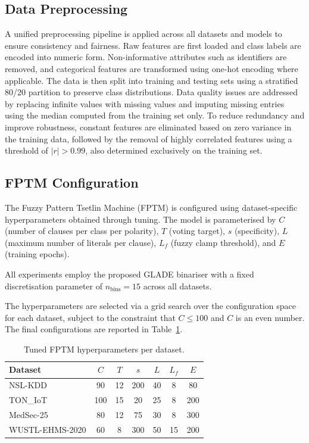 \documentclass[journal,twoside,web]{ieeecolor}
\begin{document}
\subsection{Data Preprocessing}
\label{sec:preprocessing}

A unified preprocessing pipeline is applied across all datasets and models to ensure consistency and fairness. Raw features are first loaded and class labels are encoded into numeric form. Non-informative attributes such as identifiers are removed, and categorical features are transformed using one-hot encoding where applicable. The data is then split into training and testing sets using a stratified 80/20 partition to preserve class distributions. Data quality issues are addressed by replacing infinite values with missing values and imputing missing entries using the median computed from the training set only. To reduce redundancy and improve robustness, constant features are eliminated based on zero variance in the training data, followed by the removal of highly correlated features using a threshold of $|r| > 0.99$, also determined exclusively on the training set.

\subsection{FPTM Configuration}
\label{sec:fptm-config}

The Fuzzy Pattern Tsetlin Machine (FPTM) is configured using
dataset-specific hyperparameters obtained through tuning.
The model is parameterised by $C$ (number of clauses per class per
polarity), $T$ (voting target), $s$ (specificity), $L$ (maximum number
of literals per clause), $L_f$ (fuzzy clamp threshold), and $E$
(training epochs).

All experiments employ the proposed GLADE binariser with a fixed
discretisation parameter of $n_{\text{bins}} = 15$ across all datasets.

The hyperparameters are selected via a grid search over the
configuration space for each dataset, subject to the constraint that
$C \leq 100$ and $C$ is an even number. The final configurations are
reported in Table~\ref{tab:tm_hparams}.

\begin{table}[t]
\centering
\caption{Tuned FPTM hyperparameters per dataset.}
\label{tab:tm_hparams}
\renewcommand{\arraystretch}{1.2}
\small
\begin{tabular}{|l|c|c|c|c|c|c|}
\hline
\textbf{Dataset} & $C$ & $T$ & $s$ & $L$ & $L_f$ & $E$ \\
\hline
NSL-KDD         & 90  & 12 & 200 & 40 & 8  & 80  \\
\hline
TON\_IoT        & 100 & 15 & 20  & 25 & 8  & 200 \\
\hline
MedSec-25       & 80  & 12 & 75  & 30 & 8  & 300 \\
\hline
WUSTL-EHMS-2020 & 60  & 8  & 300 & 50 & 15 & 200 \\
\hline
\end{tabular}
\end{table}
\end{document}
